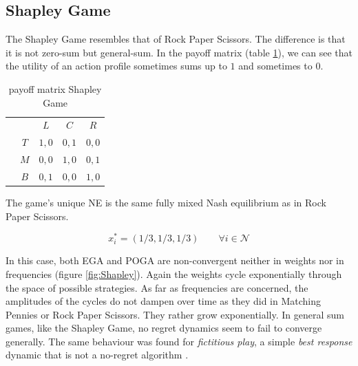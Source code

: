 \subsection{Shapley Game}\label{subsection:shapleyGame}

The Shapley Game resembles that of Rock Paper Scissors. The difference is that it is not zero-sum but general-sum. In the payoff matrix (table \ref{tab:payoffShapley}), we can see that the utility of an action profile sometimes sums up to $1$ and sometimes to $0$. 

\begin{table}[H]\centering
\setlength{\extrarowheight}{2pt}
\begin{tabular}{cc|c|c|c|}
  & \multicolumn{1}{c}{} & \multicolumn{1}{c}{$L$}  & \multicolumn{1}{c}{$C$}  & \multicolumn{1}{c}{$R$} \\\cline{3-5}
            & $T$ & $1,0$ & $0,1$ & $0,0$ \\ \cline{3-5}
            & $M$ & $0,0$ & $1,0$ & $0,1$ \\\cline{3-5}
            & $B$ & $0,1$ & $0,0$ & $1,0$ \\\cline{3-5}
\end{tabular}\caption{\label{tab:payoffShapley}payoff matrix Shapley Game}
\end{table}

The game's unique NE is the same fully mixed Nash equilibrium as in Rock Paper Scissors.

\begin{equation*}
    x_{i}^{*} = (1/3,1/3,1/3) \qquad \forall i \in \mathcal{N}
\end{equation*}

In this case, both EGA and POGA are non-convergent neither in weights nor in frequencies (figure \ref{fig:Shapley}). Again the weights cycle exponentially through the space of possible strategies. As far as frequencies are concerned, the amplitudes of the cycles do not dampen over time as they did in Matching Pennies or Rock Paper Scissors. They rather grow exponentially. In general sum games, like the Shapley Game, no regret dynamics seem to fail to converge generally. The same behaviour was found for \textit{fictitious play}, a simple \textit{best response} dynamic that is not a no-regret algorithm \cite{jafari}.


